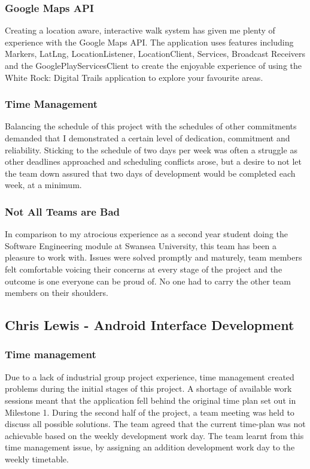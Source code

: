 \documentclass[11pt,a4paper]{report}
\begin{document}
\subsubsection{Google Maps API}
Creating a location aware, interactive walk system has given me plenty of experience with the Google Maps API. The application uses features including Markers, LatLng, LocationListener, LocationClient, Services, Broadcast Receivers and the GooglePlayServicesClient to create the enjoyable experience of using the White Rock: Digital Trails application to explore your favourite areas.

\subsubsection{Time Management}
Balancing the schedule of this project with the schedules of other commitments demanded that I demonstrated a certain level of dedication, commitment and reliability. Sticking to the schedule of two days per week was often a struggle as other deadlines approached and scheduling conflicts arose, but a desire to not let the team down assured that two days of development would be completed each week, at a minimum. 

\subsubsection{Not All Teams are Bad}
In comparison to my atrocious experience as a second year student doing the Software Engineering module at Swansea University, this team has been a pleasure to work with. Issues were solved promptly and maturely, team members felt comfortable voicing their concerns at every stage of the project and the outcome is one everyone can be proud of. No one had to carry the other team members on their shoulders.



\subsection{Chris Lewis - Android Interface Development}

\subsubsection{Time management}
Due to a lack of industrial group project experience, time management created problems during the initial stages of this project. A shortage of available work sessions meant that the application fell behind the original time plan set out in Milestone 1. During the second half of the project, a team meeting was held to discuss all possible solutions. The team agreed that the current time-plan was not achievable based on the weekly development work day. The team learnt from this time management issue, by assigning an addition development work day to the weekly timetable.
\end{document}
